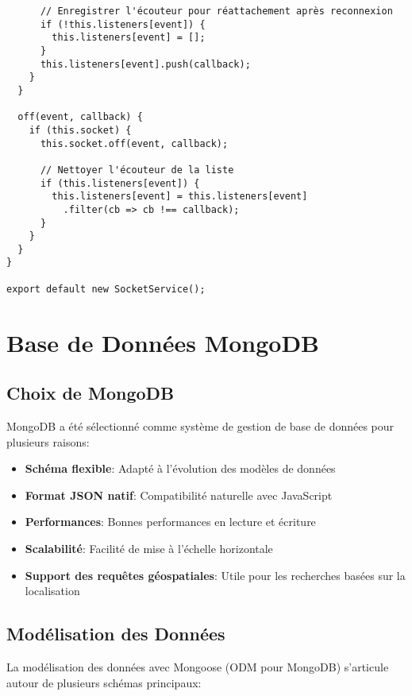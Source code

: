 \begin{verbatim}
      // Enregistrer l'écouteur pour réattachement après reconnexion
      if (!this.listeners[event]) {
        this.listeners[event] = [];
      }
      this.listeners[event].push(callback);
    }
  }
  
  off(event, callback) {
    if (this.socket) {
      this.socket.off(event, callback);
      
      // Nettoyer l'écouteur de la liste
      if (this.listeners[event]) {
        this.listeners[event] = this.listeners[event]
          .filter(cb => cb !== callback);
      }
    }
  }
}

export default new SocketService();
\end{verbatim}

\section{Base de Données MongoDB}

\subsection{Choix de MongoDB}

MongoDB a été sélectionné comme système de gestion de base de données pour plusieurs raisons:

\begin{itemize}
    \item \textbf{Schéma flexible}: Adapté à l'évolution des modèles de données
    \item \textbf{Format JSON natif}: Compatibilité naturelle avec JavaScript
    \item \textbf{Performances}: Bonnes performances en lecture et écriture
    \item \textbf{Scalabilité}: Facilité de mise à l'échelle horizontale
    \item \textbf{Support des requêtes géospatiales}: Utile pour les recherches basées sur la localisation
\end{itemize}

\subsection{Modélisation des Données}

La modélisation des données avec Mongoose (ODM pour MongoDB) s'articule autour de plusieurs schémas principaux:

